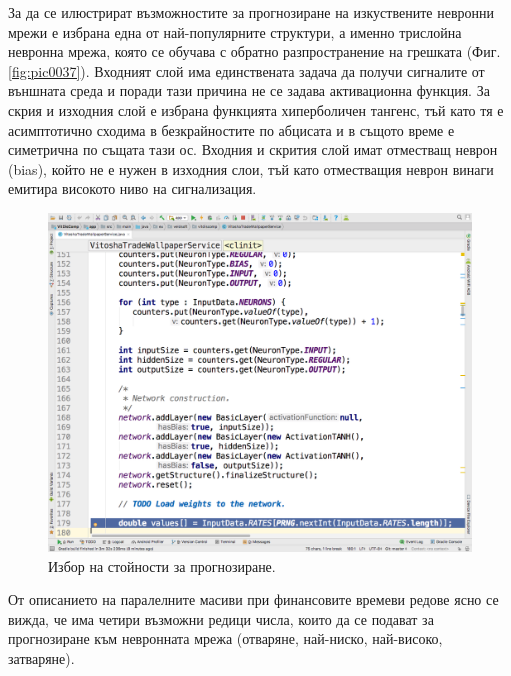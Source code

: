 \documentclass[book,14pt,oneside,openany]{memoir}
\begin{document}
За да се илюстрират възможностите за прогнозиране на изкуствените невронни мрежи е избрана една от най-популярните структури, а именно трислойна невронна мрежа, която се обучава с обратно разпространение на грешката (Фиг. \ref{fig:pic0037}). Входният слой има единствената задача да получи сигналите от външната среда и поради тази причина не се задава активационна функция. За скрия и изходния слой е избрана функцията хиперболичен тангенс, тъй като тя е асимптотично сходима в безкрайностите по абцисата и в същото време е симетрична по същата тази ос. Входния и скрития слой имат отместващ неврон (bias), който не е нужен в изходния слои, тъй като отместващия неврон винаги емитира високото ниво на сигнализация.

\begin{figure}[h]
  \centering
  \includegraphics[height=0.45\pdfpageheight]{./images/pic0038.png}
  \caption{Избор на стойности за прогнозиране.}
\label{fig:pic0038}
\end{figure}
\FloatBarrier

От описанието на паралелните масиви при финансовите времеви редове ясно се вижда, че има четири възможни редици числа, които да се подават за прогнозиране към невронната мрежа (отваряне, най-ниско, най-високо, затваряне). 
\end{document}
